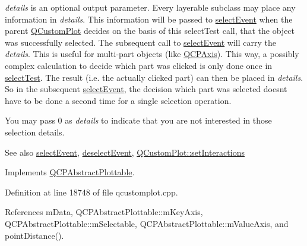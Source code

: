 {\itshape details} is an optional output parameter. Every layerable subclass may place any information in {\itshape details}. This information will be passed to \hyperlink{class_q_c_p_abstract_plottable_a16aaad02456aa23a759efd1ac90c79bf}{select\+Event} when the parent \hyperlink{class_q_custom_plot}{Q\+Custom\+Plot} decides on the basis of this select\+Test call, that the object was successfully selected. The subsequent call to \hyperlink{class_q_c_p_abstract_plottable_a16aaad02456aa23a759efd1ac90c79bf}{select\+Event} will carry the {\itshape details}. This is useful for multi-\/part objects (like \hyperlink{class_q_c_p_axis}{Q\+C\+P\+Axis}). This way, a possibly complex calculation to decide which part was clicked is only done once in \hyperlink{class_q_c_p_curve_a5af9949e725704811bbc81ecd5970b8e}{select\+Test}. The result (i.\+e. the actually clicked part) can then be placed in {\itshape details}. So in the subsequent \hyperlink{class_q_c_p_abstract_plottable_a16aaad02456aa23a759efd1ac90c79bf}{select\+Event}, the decision which part was selected doesn\textquotesingle{}t have to be done a second time for a single selection operation.

You may pass 0 as {\itshape details} to indicate that you are not interested in those selection details.

\begin{DoxySeeAlso}{See also}
\hyperlink{class_q_c_p_abstract_plottable_a16aaad02456aa23a759efd1ac90c79bf}{select\+Event}, \hyperlink{class_q_c_p_abstract_plottable_a6fa0d0f95560ea8b01ee13f296dab2b1}{deselect\+Event}, \hyperlink{class_q_custom_plot_a5ee1e2f6ae27419deca53e75907c27e5}{Q\+Custom\+Plot\+::set\+Interactions} 
\end{DoxySeeAlso}


Implements \hyperlink{class_q_c_p_abstract_plottable_a38efe9641d972992a3d44204bc80ec1d}{Q\+C\+P\+Abstract\+Plottable}.



Definition at line 18748 of file qcustomplot.\+cpp.



References m\+Data, Q\+C\+P\+Abstract\+Plottable\+::m\+Key\+Axis, Q\+C\+P\+Abstract\+Plottable\+::m\+Selectable, Q\+C\+P\+Abstract\+Plottable\+::m\+Value\+Axis, and point\+Distance().


